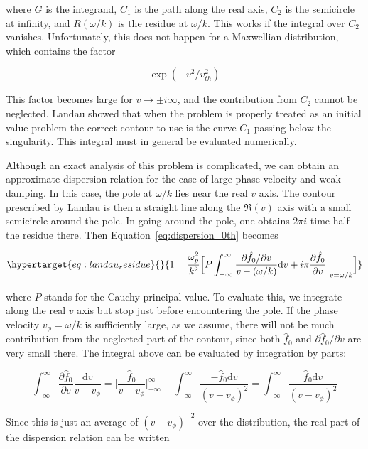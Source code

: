\documentclass[
  notoc %
]{tufte-book}
\begin{document}
where \(G\) is the integrand, \(C_1\) is the path along the real axis,
\(C_2\) is the semicircle at infinity, and \(R(\omega/k)\) is the
residue at \(\omega/k\). This works if the integral over \(C_2\)
vanishes. Unfortunately, this does not happen for a Maxwellian
distribution, which contains the factor

\[
\exp(-v^2/v_{th}^2)
\]

This factor becomes large for \(v\rightarrow \pm i \infty\), and the
contribution from \(C_2\) cannot be neglected. Landau showed that when
the problem is properly treated as an initial value problem the correct
contour to use is the curve \(C_1\) passing below the singularity. This
integral must in general be evaluated numerically.

Although an exact analysis of this problem is complicated, we can obtain
an approximate dispersion relation for the case of large phase velocity
and weak damping. In this case, the pole at \(\omega/k\) lies near the
real \(v\) axis. The contour prescribed by Landau is then a straight
line along the \(\Re(v)\) axis with a small semicircle around the pole.
In going around the pole, one obtains \(2\pi i\) time half the residue
there. Then Equation~\ref{eq:dispersion_0th} becomes

\begin{equation}\protect\hypertarget{eq:landau_residue}{}{
1 = \frac{\omega_p^2}{k^2} \Big[ P\int_{-\infty}^{\infty}\frac{\partial\hat{f}_0/\partial v}{v - (\omega/k)}\mathrm{d}v + i\pi \frac{\partial\hat{f}_0}{\partial v}\biggr\rvert_{v=\omega/k} \Big]
}\label{eq:landau_residue}\end{equation}

where \(P\) stands for the Cauchy principal value. To evaluate this, we
integrate along the real \(v\) axis but stop just before encountering
the pole. If the phase velocity \(v_\phi = \omega/k\) is sufficiently
large, as we assume, there will not be much contribution from the
neglected part of the contour, since both \(\hat{f}_0\) and
\(\partial\hat{f}_0/\partial v\) are very small there. The integral
above can be evaluated by integration by parts:

\[
\int_{-\infty}^{\infty}\frac{\partial\hat{f}_0}{\partial v}\frac{\mathrm{d}v}{v - v_\phi} = \Big[ \frac{\hat{f}_0}{v-v_\phi} \Big]_{-\infty}^{\infty} - \int_{-\infty}^{\infty}\frac{-\hat{f}_0 \mathrm{d}v}{(v-v_\phi)^2} = \int_{-\infty}^{\infty}\frac{\hat{f}_0 \mathrm{d}v}{(v-v_\phi)^2}
\]

Since this is just an average of \((v-v_\phi)^{-2}\) over the
distribution, the real part of the dispersion relation can be written
\end{document}
